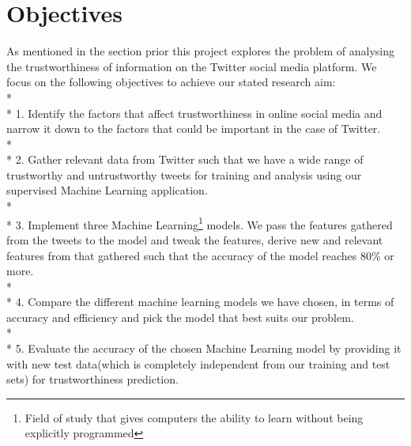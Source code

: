 \section{Objectives}
As mentioned in the section prior this project explores the problem of analysing the trustworthiness of information on the Twitter social media platform. We focus on the following objectives to achieve our stated research aim: \\*\\*
1. Identify the factors that affect trustworthiness in online social media and narrow it down to the factors that could be important in the case of Twitter. \\*\\*
2. Gather relevant data from Twitter such that we have a wide range of trustworthy and untrustworthy tweets for training and analysis using our supervised Machine Learning application.\\*\\*
3. Implement three Machine Learning\footnote{Field of study that gives computers the ability to learn without being explicitly programmed\cite{18}} models. We pass the features gathered from the tweets to the model and tweak the features, derive new and relevant features from that gathered such that the accuracy of the model reaches 80\% or more. \\*\\*
4. Compare the different machine learning models we have chosen, in terms of accuracy and efficiency and pick the model that best suits our problem. \\*\\*
5. Evaluate the accuracy of the chosen Machine Learning model by providing it with new test data(which is completely independent from our training and test sets) for trustworthiness prediction. 
